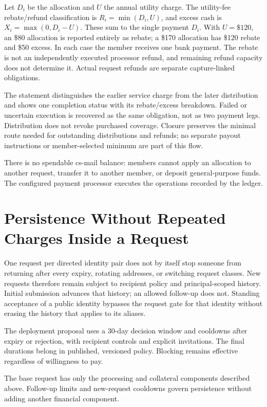\documentclass[11pt]{article}
\begin{document}
Let $D_i$ be the allocation and $U$ the annual utility charge. The utility-fee
rebate/refund classification is $R_i=\min(D_i,U)$, and excess cash is
$X_i=\max(0,D_i-U)$. These sum to the single payment $D_i$. With $U=\$120$,
an \$80 allocation is reported entirely as rebate; a \$170 allocation has
\$120 rebate and \$50 excess. In each case the member receives one bank payment.
The rebate is not an independently executed processor refund, and remaining
refund capacity does not determine it. Actual request refunds are separate
capture-linked obligations.

The statement distinguishes the earlier service charge from the later distribution
and shows one completion status with its rebate/excess breakdown. Failed or
uncertain execution is recovered as the same obligation, not as two payment legs.
Distribution does not revoke purchased coverage. Closure preserves the minimal
route needed for outstanding distributions and refunds; no separate payout
instructions or member-selected minimum are part of this flow.

There is no spendable cs-mail balance: members cannot apply an allocation to
another request, transfer it to another member, or deposit general-purpose funds.
The configured payment processor executes the operations recorded by the ledger.

\section{Persistence Without Repeated Charges Inside a Request}

One request per directed identity pair does not by itself stop someone from
returning after every expiry, rotating addresses, or switching request classes. New requests therefore remain
subject to recipient policy and principal-scoped history. Initial submission
advances that history; an allowed follow-up does not. Standing acceptance of a public
identity bypasses the request gate for that identity without erasing the history
that applies to its aliases.

The deployment proposal uses a 30-day decision window and cooldowns after expiry
or rejection, with recipient controls and explicit invitations. The final
durations belong in published, versioned policy. Blocking remains effective
regardless of willingness to pay.

The base request has only the processing and collateral components described
above. Follow-up limits and new-request cooldowns govern persistence without
adding another financial component.
\end{document}
